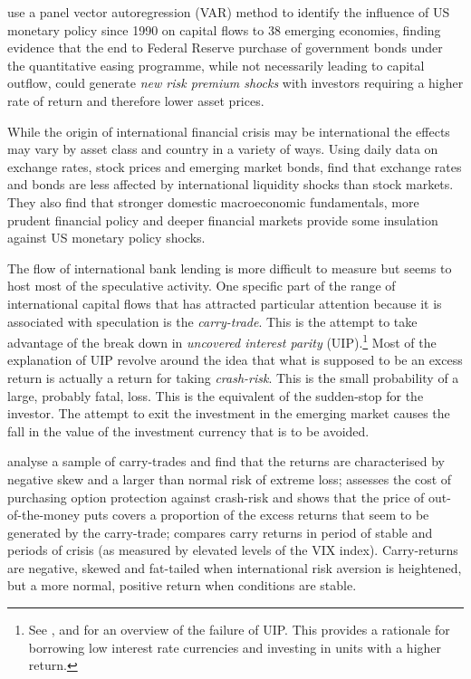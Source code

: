 \documentclass[12pt, a4paper, oneside]{article}\usepackage[]{graphicx}\usepackage[]{color}
\begin{document}
\citet{IMFLatam} use a panel vector autoregression (VAR) method to identify the influence of US monetary policy since 1990 on capital flows to 38 emerging economies, finding evidence that the end to Federal Reserve purchase of government bonds under the quantitative easing programme, while not necessarily leading to capital outflow, could generate \emph{new risk premium shocks} with investors requiring a higher rate of return and therefore lower asset prices.

While the origin of international financial crisis may be international the effects may vary by asset class and country in a variety of ways.  Using daily data on exchange rates, stock prices and emerging market bonds, \citet{Tapering} find that exchange rates and bonds are less affected by international liquidity shocks than stock markets.  They also find that stronger domestic macroeconomic fundamentals, more prudent financial policy and deeper financial markets provide some insulation against US monetary policy shocks.

The flow of international bank lending is more difficult to measure but seems to host most of the speculative activity.  One specific part of the range of international capital flows that has attracted particular attention because it is associated with speculation is the \emph{carry-trade}.  This is the attempt to take advantage of the break down in \emph{uncovered interest parity} (UIP).\footnote{See \citet{fama1993common}, \citet{FrootFrankelFDB} and \citet{Hayward2013} for an overview of the failure of UIP.  This provides a rationale for borrowing low interest rate currencies and investing in units with a higher return.} Most of the explanation of UIP revolve around the idea that what is supposed to be an excess return is actually a return for taking \emph{crash-risk}.  This is the small probability of a large, probably fatal, loss. This is the equivalent of the sudden-stop for the investor. The attempt to exit the investment in the emerging market causes the fall in the value of the investment currency that is to be avoided. 

\citet{BrunnermeierCarry} analyse a sample of carry-trades and find that the returns are characterised by negative skew and a larger than normal risk of extreme loss; \citet{JurekCrash} assesses the cost of purchasing option protection against crash-risk and shows that the price of out-of-the-money puts covers a proportion of the excess returns that seem to be generated by the carry-trade; \citet{Hayward2013} compares carry returns in period of stable and periods of crisis (as measured by elevated levels of the VIX index).  Carry-returns are negative, skewed and fat-tailed when international risk aversion is heightened, but a more normal, positive return when conditions are stable. 
\end{document}
